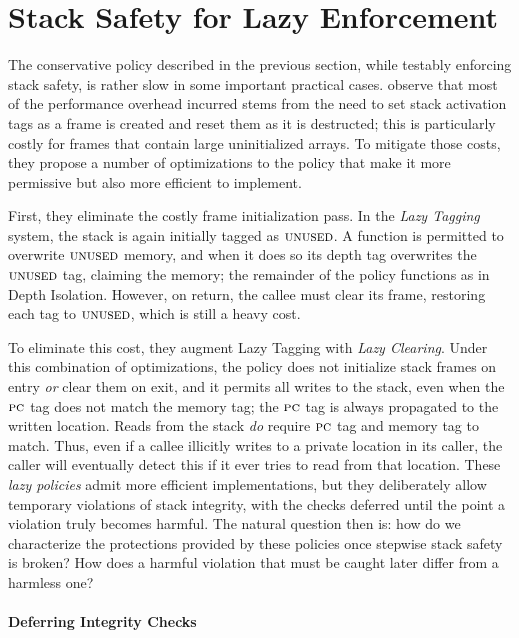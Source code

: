 \documentclass[acmsmall,review,anonymous]{acmart}\settopmatter{printfolios=true,printccs=false,printacmref=false}
\begin{document}
{{\section{Stack Safety for Lazy Enforcement}
\label{sec:lazy}

The conservative policy described in the previous section, while
testably enforcing stack safety, is rather slow in
some important practical cases. \citet{DBLP:conf/sp/RoesslerD18} observe
that most of the performance overhead incurred
stems from the need to set stack activation tags as a frame is created
and reset them as it is destructed;  this
is particularly costly for frames that contain large uninitialized arrays.
To mitigate those costs, they propose a number of optimizations to the policy
that make it more permissive but also more efficient to implement.

First, they eliminate the costly frame initialization pass. In the {\em Lazy Tagging}
system, the stack is again initially tagged as \(\textsc{unused}\).
A function is permitted
to overwrite \(\textsc{unused}\) memory, and when it does so its depth tag overwrites
the \(\textsc{unused}\) tag, claiming the memory; the remainder of the policy functions
as in Depth Isolation. However, on return, the callee must clear its frame, restoring
each tag to \(\textsc{unused}\), which is still a heavy cost.

To eliminate this cost, they augment Lazy Tagging
with {\em Lazy Clearing}. Under this combination of optimizations,
the policy does not initialize stack frames on entry \emph{or} clear them on exit,
and it permits all writes to the stack, even when the $\textsc{pc}$ tag
does not match the memory tag; the \(\textsc{pc}\) tag is always propagated
to the written location. Reads from the stack \emph{do} require $\textsc{pc}$
tag and memory tag to match. Thus, even if a callee illicitly writes to
a private location in its caller, the caller will eventually detect this
if it ever tries to read from that location.
%
These \emph{lazy policies} admit more efficient implementations, but
they deliberately allow temporary violations of stack integrity,
with the checks deferred until the point a violation truly becomes
harmful. The natural question then is: how do we characterize the
protections provided by these policies once stepwise stack safety is broken?
How does a harmful violation that must be caught later differ from a
harmless one?

\paragraph*{Deferring Integrity Checks}

}}
\end{document}
